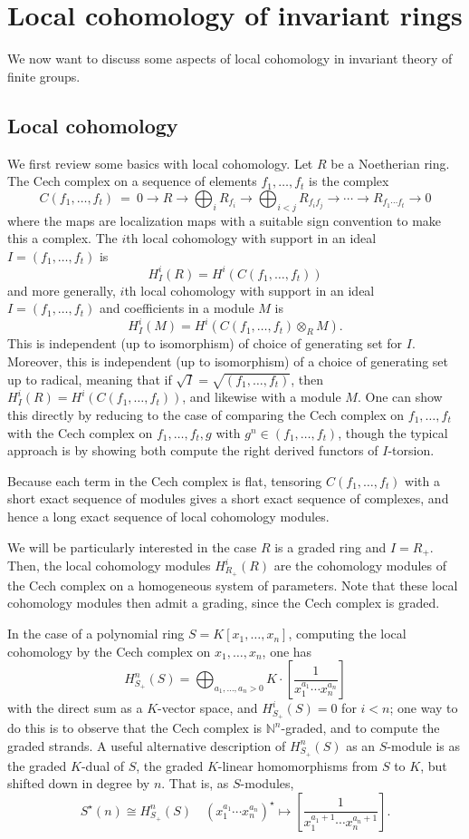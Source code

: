 \documentclass[12pt]{amsart}
\theoremstyle{definition}
\numberwithin{equation}{theorem}
\def\NN{\mathbb{N}}
\def\to{\longrightarrow}
\def\mapsto{\longmapsto}
\begin{document}
\newpage

\section{Local cohomology of invariant rings}

We now want to discuss some aspects of local cohomology in invariant theory of finite groups.

\subsection*{Local cohomology} We first review some basics with local cohomology.
Let $R$ be a Noetherian ring. The Cech complex on a sequence of elements $f_1,\dots, f_t$ is the complex
\[ C(f_1,\dots, f_t) \ = \ 0 \to R \to \bigoplus_i R_{f_i} \to \bigoplus_{i<j} R_{f_i f_j} \to \cdots \to R_{f_1 \cdots f_t} \to 0\]
where the maps are localization maps with a suitable sign convention to make this a complex. The $i$th local cohomology with support in an ideal $I=(f_1,\dots,f_t)$ is
\[ H^i_I(R) = H^i ( C(f_1,\dots, f_t) )\]
and more generally, $i$th local cohomology with support in an ideal $I=(f_1,\dots,f_t)$ and coefficients in a module $M$ is
\[ H^i_I(M) = H^i ( C(f_1,\dots, f_t) \otimes_R M ).\]
This is independent (up to isomorphism) of choice of generating set for $I$. Moreover, this is independent (up to isomorphism) of a choice of generating set up to radical, meaning that if $\sqrt{I}=\sqrt{(f_1,\dots,f_t)}$, then $H^i_I(R) = H^i ( C(f_1,\dots, f_t) )$, and likewise with a module $M$. One can show this directly by reducing to the case of comparing the Cech complex on $f_1,\dots,f_t$ with the Cech complex on $f_1,\dots,f_t,g$ with $g^n\in (f_1,\dots,f_t)$, though the typical approach is by showing both compute the right derived functors of $I$-torsion.

Because each term in the Cech complex is flat, tensoring $C(f_1,\dots, f_t)$ with a short exact sequence of modules gives a short exact sequence of complexes, and hence a long exact sequence of local cohomology modules.

We will be particularly interested in the case $R$ is a graded ring and $I=R_+$. Then, the local cohomology modules $H^i_{R_+}(R)$ are the cohomology modules of the Cech complex on a homogeneous system of parameters. Note that these local cohomology modules then admit a grading, since the Cech complex is graded.

In the case of a polynomial ring $S=K[x_1,\dots,x_n]$, computing the local cohomology by the Cech complex on $x_1,\dots,x_n$, one has
\[ H^n_{S_+}(S) = \bigoplus_{a_1,\dots,a_n>0} K \cdot \left[\frac{1}{ x_1^{a_1} \cdots x_n^{a_n}}\right]\]
with the direct sum as a $K$-vector space,
and $H^i_{S_+}(S)=0$ for $i<n$; one way to do this is to observe that the Cech complex is $\NN^n$-graded, and to compute the graded strands.
A useful alternative description of $H^n_{S_+}(S)$ as an $S$-module is as the graded $K$-dual of $S$, the graded $K$-linear homomorphisms from $S$ to $K$, but shifted down in degree by $n$. That is, as $S$-modules,
\[ S^{\star}(n) \cong H^n_{S_+}(S) \quad (x_1^{a_1} \cdots x_n^{a_n})^{\star} \mapsto \left[\frac{1}{ x_1^{a_1+1} \cdots x_n^{a_n+1}}\right].\]
\end{document}
